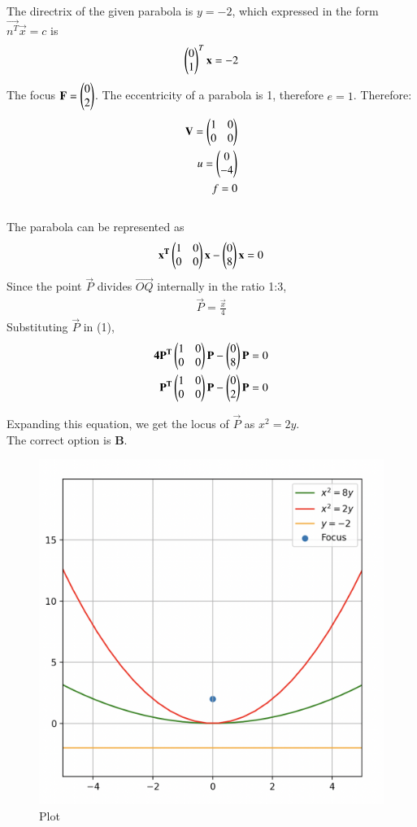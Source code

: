 \documentclass[12pt]{article}
\begin{document}
The directrix of the given parabola is $y=-2$, which expressed in the form $\vec{n^T}\vec{x} = c$ is $$\begin{pmatrix}0\\1\end{pmatrix}^T\mathbf{x} = -2$$
The focus $\mathbf{F} = \begin{pmatrix}0\\2\end{pmatrix}$. The eccentricity of a parabola is 1, therefore $e=1$.
\newpage
Therefore:
\begin{align*}
    \mathbf{V} = \begin{pmatrix} 1 & 0\\ 0 & 0\end{pmatrix}\\
    u = \begin{pmatrix}0\\-4\end{pmatrix}\\
    f = 0
\end{align*}\\
The parabola can be represented as \begin{align} \mathbf{x^T}\begin{pmatrix}1 & 0\\ 0 & 0\end{pmatrix}\mathbf{x} - \begin{pmatrix}0\\8\end{pmatrix}\mathbf{x} = 0\end{align}Since the point $\vec{P}$ divides $\vec{OQ}$ internally in the ratio 1:3, \begin{align}\vec{P} = \frac{\vec{x}}{4}\end{align}
Substituting $\vec{P}$ in (1), 
\begin{align}
\mathbf{4P^T}\begin{pmatrix}1 & 0\\ 0 & 0\end{pmatrix}\mathbf{P} - \begin{pmatrix}0\\8\end{pmatrix}\mathbf{P} = 0\\
\mathbf{P^T}\begin{pmatrix}1 & 0\\ 0 & 0\end{pmatrix}\mathbf{P} - \begin{pmatrix}0\\2\end{pmatrix}\mathbf{P} = 0
\end{align}

Expanding this equation, we get the locus of $\vec{P}$ as $x^2 = 2y$. \\

The correct option is \textbf{B}.

\begin{figure}[H]
    \centering
    \includegraphics[width=0.9\columnwidth]{Figs/847.png}
    \caption{Plot}
    \label{fig:placeholder}
\end{figure}
\end{document}
